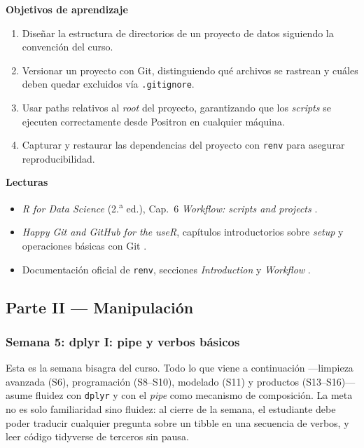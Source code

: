 \documentclass[11pt,letterpaper]{article}
\newcommand{\blue}[1]{{\color{cerulean}#1}}
\newcommand{\orange}[1]{{\color{redorange}#1}}
\newcommand{\semana}[2]{%
  \subsubsection*{\color{main}Semana #1: #2}%
}
\begin{document}
\medskip
\noindent\textbf{Objetivos de aprendizaje}
\begin{enumerate}[leftmargin=*, itemsep=1pt]
    \item Diseñar la estructura de directorios de un proyecto de datos siguiendo la convención del curso.
    \item Versionar un proyecto con Git, distinguiendo qué archivos se rastrean y cuáles deben quedar excluidos vía \texttt{.gitignore}.
    \item Usar paths relativos al \textit{root} del proyecto, garantizando que los \textit{scripts} se ejecuten correctamente desde Positron en cualquier máquina.
    \item Capturar y restaurar las dependencias del proyecto con \texttt{renv} para asegurar reproducibilidad.
\end{enumerate}

\medskip
\noindent\textbf{Lecturas}
\begin{itemize}[leftmargin=*, itemsep=1pt]
    \item \textit{R for Data Science} (2.\textsuperscript{a} ed.), Cap.\ 6 \textit{Workflow: scripts and projects} \cite{wickham2023r4ds}.
    \item \textit{Happy Git and GitHub for the useR}, capítulos introductorios sobre \textit{setup} y operaciones básicas con Git \cite{bryan-happygit}.
    \item Documentación oficial de \texttt{renv}, secciones \textit{Introduction} y \textit{Workflow} \cite{ushey-renv}.
\end{itemize}

\subsection*{\color{main}Parte II --- Manipulación}

\semana{5}{dplyr I: pipe y verbos básicos}

Esta es la \orange{semana bisagra} del curso. Todo lo que viene a continuación ---limpieza avanzada (S6), programación (S8--S10), modelado (S11) y productos (S13--S16)--- asume fluidez con \texttt{dplyr} y con el \textit{pipe} como mecanismo de composición. La meta no es solo familiaridad sino \blue{fluidez}: al cierre de la semana, el estudiante debe poder traducir cualquier pregunta sobre un tibble en una secuencia de verbos, y leer código tidyverse de terceros sin pausa.
\end{document}
